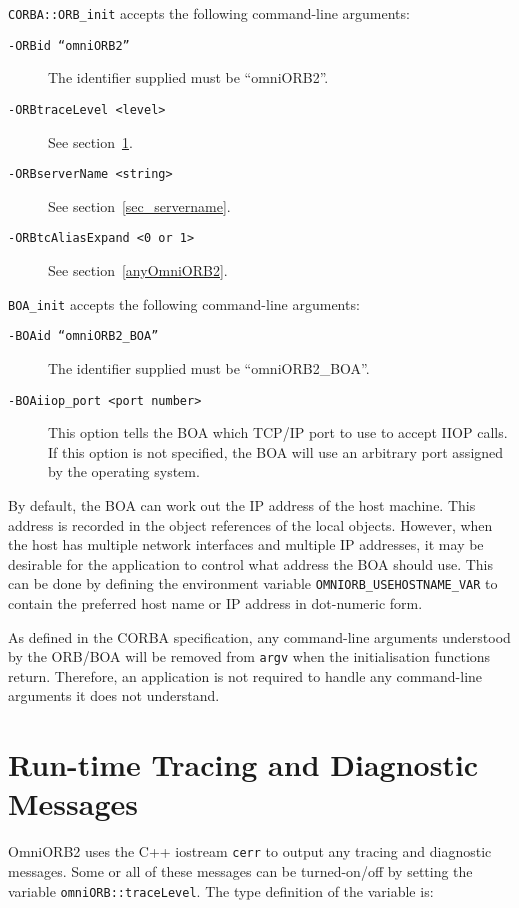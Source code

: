 \documentclass[11pt,twoside,onecolumn]{book}
\begin{document}
{\tt CORBA::ORB\_init} accepts the following command-line arguments:

\begin{description}

\item[\tt -ORBid ``omniORB2''] The identifier supplied must be ``omniORB2''.
\item[\tt -ORBtraceLevel <level>] See section~\ref{rttrace}.
\item[\tt -ORBserverName <string>] See section~\ref{sec_servername}.
\item[\tt -ORBtcAliasExpand <0 or 1>] See section~\ref{anyOmniORB2}.
\end{description}

{\tt BOA\_init} accepts the following command-line arguments:

\begin{description}

\item[\tt -BOAid ``omniORB2\_BOA''] The identifier supplied must be ``omniORB2\_BOA''.
\item[\tt -BOAiiop\_port <port number>] This option tells the BOA which
TCP/IP port to use to accept IIOP calls. If this option is not specified,
the BOA will use an arbitrary port assigned by the operating system.

\end{description}

By default, the BOA can work out the IP address of the host machine. This
address is recorded in the object references of the local objects.
However, when the host has multiple network interfaces and multiple IP
addresses, it may be desirable for the application to control what address
the BOA should use. This can be done by defining the environment variable
{\tt OMNIORB\_USEHOSTNAME\_VAR} to contain the preferred host name or IP
address in dot-numeric form.


As defined in the CORBA specification, any command-line arguments
understood by the ORB/BOA will be removed from {\tt argv} when the
initialisation functions return. Therefore, an application is not required
to handle any command-line arguments it does not understand.

\section{Run-time Tracing and Diagnostic Messages}
\label{rttrace}

OmniORB2 uses the C++ iostream {\tt cerr} to output any tracing and
diagnostic messages. Some or all of these messages can be turned-{on/off} by
setting the variable {\tt omniORB::traceLevel}. The type definition of
the variable is:
\end{document}
